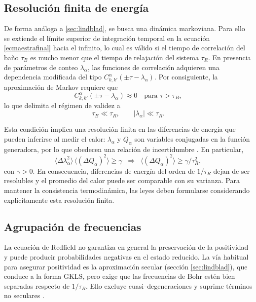\subsection{Resolución finita de energía}

De forma análoga a \ref{sec:lindblad}, se busca una dinámica markoviana. Para ello se extiende el límite superior de integración temporal en la ecuación \eqref{ecmaestrafinal} hacia el infinito, lo cual es válido si el tiempo de correlación del baño \(\tau_{B}\) es mucho menor que el tiempo de relajación del sistema \(\tau_{R}\). En presencia de parámetros de conteo \(\lambda_{\alpha}\), las funciones de correlación adquieren una dependencia modificada del tipo \(C^{\alpha}_{k,k'}(\pm \tau-\lambda_{\alpha})\). Por consiguiente, la aproximación de Markov requiere que
\[
    C^{\alpha}_{k,k'}(\pm \tau-\lambda_{\alpha}) \approx 0 
    \quad \text{para } \tau>\tau_{B},
\]
lo que delimita el régimen de validez a
\[
    \tau_{B}\ll \tau_{R},
    \qquad 
    |\lambda_{\alpha}|\ll \tau_{R}.
\]

Esta condición implica una resolución finita en las diferencias de energía que pueden inferirse al medir el calor: \(\lambda_{\alpha}\) y \(Q_{\alpha}\) son variables conjugadas en la función generadora, por lo que obedecen una relación de incertidumbre \cite{folland1997uncertainty}. En particular,
\[
    \langle \Delta \lambda^{2}_{\alpha} \rangle\,\langle (\Delta Q_{\alpha})^{2}\rangle \ge \gamma
    \;\;\Rightarrow\;\;
    \langle (\Delta Q_{\alpha})^{2}\rangle \ge \gamma/\tau_{R}^{2},
\]
con \(\gamma>0\). En consecuencia, diferencias de energía del orden de \(1/\tau_{R}\) dejan de ser resolubles y el promedio del calor puede ser comparable con su varianza. Para mantener la consistencia termodinámica, las leyes deben formularse considerando explícitamente esta resolución finita.
\label{sec2:finiteresol}

\subsection{Agrupación de frecuencias}

La ecuación de Redfield no garantiza en general la preservación de la positividad y puede producir probabilidades negativas en el estado reducido. La vía habitual para asegurar positividad es la aproximación secular (sección \ref{sec:lindblad}), que conduce a la forma GKLS, pero exige que las frecuencias de Bohr estén bien separadas respecto de \(1/\tau_{R}\). Ello excluye cuasi–degeneraciones y suprime términos no seculares \cite{trushechkin2021unified}.
\\


